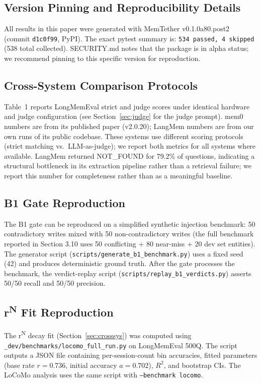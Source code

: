 \documentclass[11pt]{article}
\begin{document}
\subsection{Version Pinning and Reproducibility Details}

All results in this paper were generated with MemTether v0.1.0a80.post2 (commit \texttt{d1c0f99}, PyPI). The exact pytest summary is: \texttt{534 passed, 4 skipped} (538 total collected). SECURITY.md notes that the package is in alpha status; we recommend pinning to this specific version for reproduction.

\subsection{Cross-System Comparison Protocols}

Table~1 reports LongMemEval strict and judge scores under identical hardware and judge configuration (see Section~\ref{sec:judge} for the judge prompt). mem0 numbers are from its published paper (v2.0.20); LangMem numbers are from our own runs of its public codebase. These systems use different scoring protocols (strict matching vs.\ LLM-as-judge); we report both metrics for all systems where available. LangMem returned NOT\_FOUND for 79.2\% of questions, indicating a structural bottleneck in its extraction pipeline rather than a retrieval failure; we report this number for completeness rather than as a meaningful baseline.

\subsection{B1 Gate Reproduction}

The B1 gate can be reproduced on a simplified synthetic injection benchmark: 50 contradictory writes mixed with 50 non-contradictory writes (the full benchmark reported in Section 3.10 uses 50 conflicting + 80 near-miss + 20 dev set entities). The generator script (\texttt{scripts/generate\_b1\_benchmark.py}) uses a fixed seed (42) and produces deterministic ground truth. After the gate processes the benchmark, the verdict-replay script (\texttt{scripts/replay\_b1\_verdicts.py}) asserts 50/50 recall and 50/50 precision.

\subsection{r\textsuperscript{N} Fit Reproduction}

The r\textsuperscript{N} decay fit (Section~\ref{sec:crosssys}) was computed using \texttt{\_dev/benchmarks/locomo\_full\_run.py} on LongMemEval 500Q. The script outputs a JSON file containing per-session-count bin accuracies, fitted parameters (base rate $r = 0.736$, initial accuracy $a = 0.702$), $R^2$, and bootstrap CIs. The LoCoMo analysis uses the same script with \texttt{--benchmark locomo}.
\end{document}
